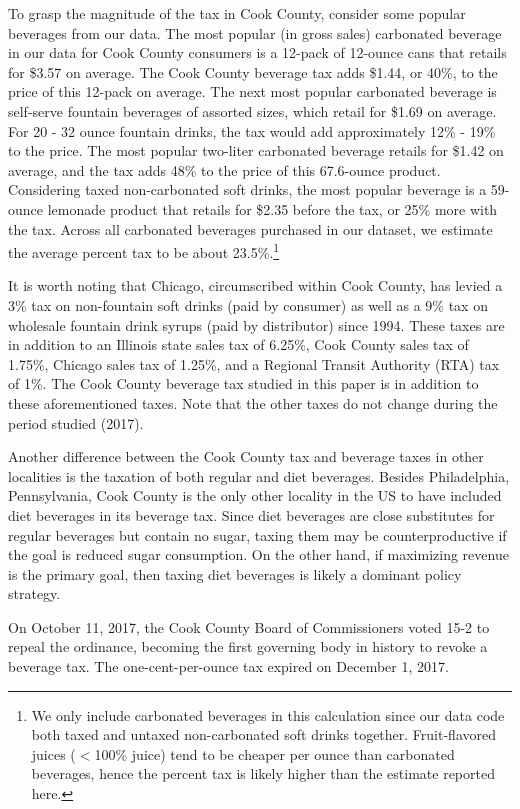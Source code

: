 \documentclass[12pt]{article}
\begin{document}
To grasp the magnitude of the tax in Cook County, consider some popular beverages from our data. The most popular (in gross sales) carbonated beverage in our data for Cook County consumers is a 12-pack of 12-ounce cans that retails for \$3.57 on average. The Cook County beverage tax adds \$1.44, or 40\%, to the price of this 12-pack on average. The next most popular carbonated beverage is self-serve fountain beverages of assorted sizes, which retail for \$1.69 on average. For 20 - 32 ounce fountain drinks, the tax would add approximately 12\% - 19\% to the price. The most popular two-liter carbonated beverage retails for \$1.42 on average, and the tax adds 48\% to the price of this 67.6-ounce product. Considering taxed non-carbonated soft drinks, the most popular beverage is a 59-ounce lemonade product that retails for \$2.35 before the tax, or 25\% more with the tax. Across all carbonated beverages purchased in our dataset, we estimate the average percent tax to be about 23.5\%.\footnote{We only include carbonated beverages in this calculation since our data code both taxed and untaxed non-carbonated soft drinks together. Fruit-flavored juices ($<$100\% juice) tend to be cheaper per ounce than carbonated beverages, hence the percent tax is likely higher than the estimate reported here.}

It is worth noting that Chicago, circumscribed within Cook County, has levied a 3\% tax on non-fountain soft drinks (paid by consumer) as well as a 9\% tax on wholesale fountain drink syrups (paid by distributor) since 1994. These taxes are in addition to an Illinois state sales tax of 6.25\%, Cook County sales tax of 1.75\%, Chicago sales tax of 1.25\%, and a Regional Transit Authority (RTA) tax of 1\%. The Cook County beverage tax studied in this paper is in addition to these aforementioned taxes. Note that the other taxes do not change during the period studied (2017).

Another difference between the Cook County tax and beverage taxes in other localities is the taxation of both regular and diet beverages. Besides Philadelphia, Pennsylvania, Cook County is the only other locality in the US to have included diet beverages in its beverage tax. Since diet beverages are close substitutes for regular beverages but contain no sugar, taxing them may be counterproductive if the goal is reduced sugar consumption. On the other hand, if maximizing revenue is the primary goal, then taxing diet beverages is likely a dominant policy strategy.

On October 11, 2017, the Cook County Board of Commissioners voted 15-2 to repeal the ordinance, becoming the first governing body in history to revoke a beverage tax. The one-cent-per-ounce tax expired on December 1, 2017.
\end{document}
